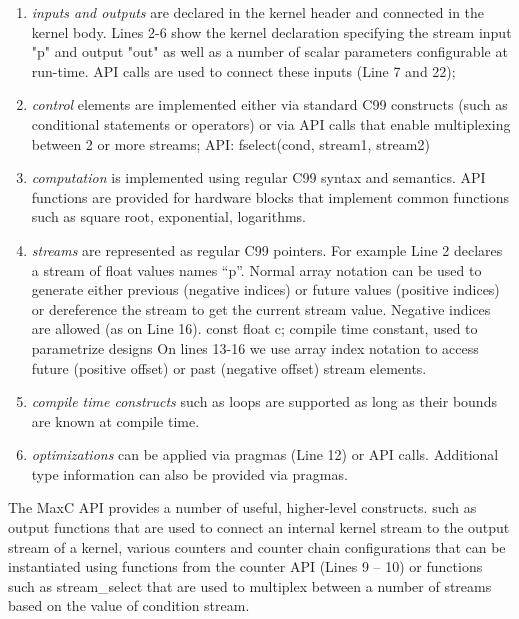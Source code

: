 \begin{enumerate}
\item \emph{inputs and outputs} are declared in the kernel header and
  connected in the kernel body. Lines 2-6 show the kernel declaration
  specifying the stream input "p" and output "out" as well as a number
  of scalar parameters configurable at run-time. API calls are used to
  connect these inputs (Line 7 and 22);

\item \emph{control} elements are implemented either via standard C99
  constructs (such as conditional statements or operators) or via API
  calls that enable multiplexing between 2 or more streams; API:
  fselect(cond, stream1, stream2)

\item \emph{computation} is implemented using regular C99 syntax and
  semantics. API functions are provided for hardware blocks that
  implement common functions such as square root, exponential,
  logarithms.


\item \emph{streams} are represented as regular C99 pointers. For
  example Line 2 declares a stream of float values names ``p''.
  Normal array notation can be used to generate either previous
  (negative indices) or future values (positive indices) or
  dereference the stream to get the current stream value. Negative
  indices are allowed (as on Line 16). const float c; compile time
  constant, used to parametrize designs On lines 13-16 we use array
  index notation to access future (positive offset) or past (negative
  offset) stream elements.

\item \emph{compile time constructs} such as loops are supported as
  long as their bounds are known at compile time.

\item \emph{optimizations} can be applied via pragmas (Line 12) or API
  calls. Additional type information can also be provided via pragmas.

\end{enumerate}

The MaxC API provides a number of useful, higher-level constructs.
such as output functions that are used to connect an internal kernel
stream to the output stream of a kernel, various counters and counter
chain configurations that can be instantiated using functions from the
counter API (Lines 9 -- 10) or functions such as stream\_select that
are used to multiplex between a number of streams based on the value
of condition stream.




